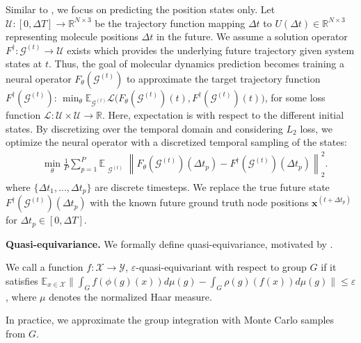 Similar to \cite{xu_equivariant_2024}, we focus on predicting the position states only. Let $\mathcal{U} \colon [0, \Delta T] \rightarrow \mathbb R^{N \times  3}$ be the trajectory function mapping $\Delta t$ to $U(\Delta t) \in \mathbb R^{N \times  3}$ representing molecule positions $\Delta t$ in the future. We assume a solution operator $F^\dagger \colon \mathcal{G}^{(t)} \rightarrow \mathcal{U}$ exists which provides the underlying future trajectory given system states at $t$. Thus, the goal of molecular dynamics prediction becomes training a neural operator $F_\theta(\mathcal{G}^{(t)})$ to approximate the target trajectory function $F^\dagger(\mathcal{G}^{(t)})$: $\min_\theta \mathbb E_{\mathcal{G}^{(t)}} \mathcal{L} \big(F_\theta(\mathcal{G}^{(t)}) (t) , F^\dagger(\mathcal{G}^{(t)})(t) \big)$,
for some loss function $\mathcal{L} \colon \mathcal{U} \times \mathcal{U}\rightarrow \mathbb R$. Here, expectation is with respect to the different initial states.
By discretizing over the temporal domain and considering $L_2$ loss, we optimize the neural operator with a discretized temporal sampling of the states:
\begin{align}
    &\min_{\theta} \frac{1}{P} \sum_{p=1}^P \mathbb{E}_{\substack{
            \mathcal{G}^{(t)}  \\
            }
        } 
         \left\|
            F_\theta\left( \mathcal{G}^{(t)}  \right)(\Delta t_p) - F^\dagger \left (\mathcal{G}^{(t)} \right) (\Delta t_p)
        \right\|_{2}^{2}.
        \label{eq:objective_function}
\end{align}
where $\{ \Delta t_1, ..., \Delta t_p \}$ are discrete timesteps. We replace the true future state $F^\dagger(\mathcal{G}^{(t)})(\Delta t_p)$ with the known future ground truth node positions $\mathbf{x}^{(t+\Delta t_p)}$ for $\Delta t_p \in [0, \Delta T]$.

{
\textbf{Quasi-equivariance.}
\label{def:quasi_equivariance}
We formally define quasi-equivariance, motivated by \cite{elhag_relaxed_2025}.
\begin{definition}
We call a function $f: \mathcal{X} \rightarrow \mathcal{Y}$, $\varepsilon$-quasi-equivariant with respect to group $G$ if it satisfies $\mathbb E_{x \in \mathcal{X}} \|  \int_G f( \phi(g)(x) ) d \mu (g)  - \int_G \rho(g) (f(x)) d\mu(g)
\| \leq \varepsilon$, 
where $\mu$ denotes the normalized Haar measure. 
\end{definition}
In practice, we approximate the group integration with Monte Carlo samples from $G$. 
}

